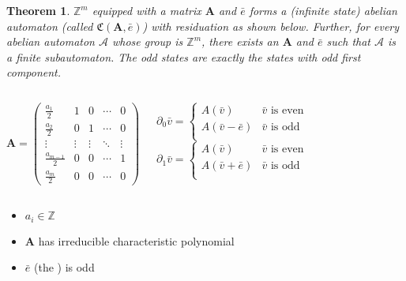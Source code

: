 \documentclass{beamer}
\newtheorem{thm}{Theorem}
\newcommand{\2}{\textbf{2}}
\newcommand{\A}{\mathcal{A}}
\newcommand{\Z}{\mathbb{Z}}
\newcommand{\del}{\partial}
\newcommand{\Am}{\textbf{A}}
\newcommand{\e}{\bar{e}}
\renewcommand{\v}{\bar{v}}
\newcommand{\C}{\mathfrak{C}(\Am,\e)}
\begin{document}
\begin{frame}
  \begin{thm}
    $\Z^m$ equipped with a matrix $\Am$ and $\e$ forms a 
    (infinite state) abelian automaton (called $\C$) with residuation as shown below. 
    Further, for \emph{every} abelian automaton $\A$ whose group is $\Z^m$, 
    there exists an $\Am$ and $\e$ such that $\A$ is a finite subautomaton.
    The odd states are exactly the states with odd first component.
  \end{thm}
  \begin{columns}
    \[
      \Am = 
      \begin{pmatrix}
        \frac{a_{1}}{2}   & 1      & 0      & \cdots & 0      \\
        \frac{a_{2}}{2}   & 0      & 1      & \cdots & 0      \\
        \vdots            & \vdots & \vdots & \ddots & \vdots \\
        \frac{a_{m-1}}{2} & 0      & 0      & \cdots & 1      \\
        \frac{a_{m}}{2}   & 0      & 0      & \cdots & 0
      \end{pmatrix}
    \]

      \[
        \del_0 \v = 
        \begin{cases}
          A(\v)      & \v \text{ is even}\\
          A(\v - \e) & \v \text{ is odd}\\
        \end{cases}
      \]
      \[
        \del_1 \v = 
        \begin{cases}
          A(\v)      & \v \text{ is even}\\
          A(\v + \e) & \v \text{ is odd}\\
        \end{cases}
      \]
  \end{columns}

  \begin{itemize}
    \item $a_i \in \Z$
    \item $\Am$ has irreducible characteristic polynomial
    \item $\e$ (the ) is odd
  \end{itemize}

\end{frame}
\end{document}
